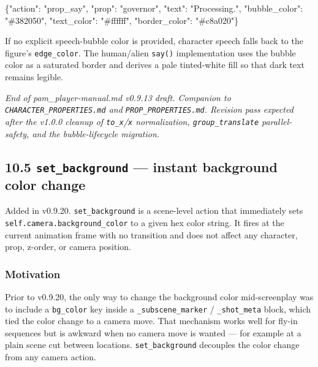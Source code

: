 \documentclass[
  12pt,
  letterpaper,
]{book}
\newenvironment{Shaded}{}{}
\newcommand{\DataTypeTok}[1]{\textcolor[rgb]{0.56,0.13,0.00}{#1}}
\newcommand{\FunctionTok}[1]{\textcolor[rgb]{0.02,0.16,0.49}{#1}}
\newcommand{\StringTok}[1]{\textcolor[rgb]{0.25,0.44,0.63}{#1}}
\begin{document}
\begin{Shaded}
\begin{Highlighting}[]
\FunctionTok{\{}\DataTypeTok{"action"}\FunctionTok{:} \StringTok{"prop\_say"}\FunctionTok{,} \DataTypeTok{"prop"}\FunctionTok{:} \StringTok{"governor"}\FunctionTok{,}
 \DataTypeTok{"text"}\FunctionTok{:} \StringTok{"Processing."}\FunctionTok{,}
 \DataTypeTok{"bubble\_color"}\FunctionTok{:} \StringTok{"\#382050"}\FunctionTok{,}
 \DataTypeTok{"text\_color"}\FunctionTok{:} \StringTok{"\#ffffff"}\FunctionTok{,}
 \DataTypeTok{"border\_color"}\FunctionTok{:} \StringTok{"\#c8a020"}\FunctionTok{\}}
\end{Highlighting}
\end{Shaded}

If no explicit speech-bubble color is provided, character speech falls
back to the figure's \texttt{edge\_color}. The human/alien
\texttt{say()} implementation uses the bubble color as a saturated
border and derives a pale tinted-white fill so that dark text remains
legible.


\emph{End of pam\_player-manual.md v0.9.13 draft. Companion to
\texttt{CHARACTER\_PROPERTIES.md} and \texttt{PROP\_PROPERTIES.md}.
Revision pass expected after the v1.0.0 cleanup of
\texttt{to\_x}/\texttt{x} normalization, \texttt{group\_translate}
parallel-safety, and the bubble-lifecycle migration.}

\subsection{\texorpdfstring{10.5 \texttt{set\_background} --- instant
background color
change}{10.5 set\_background --- instant background color change}}\label{set-background}

Added in v0.9.20. \texttt{set\_background} is a scene-level action that
immediately sets \texttt{self.camera.background\_color} to a given hex
color string. It fires at the current animation frame with no transition
and does not affect any character, prop, z-order, or camera position.

\subsubsection{Motivation}\label{set-background-motivation}

Prior to v0.9.20, the only way to change the background color
mid-screenplay was to include a \texttt{bg\_color} key inside a
\texttt{\_subscene\_marker} / \texttt{\_shot\_meta} block, which tied
the color change to a camera move. That mechanism works well for
fly-in sequences but is awkward when no camera move is wanted --- for
example at a plain scene cut between locations. \texttt{set\_background}
decouples the color change from any camera action.
\end{document}

